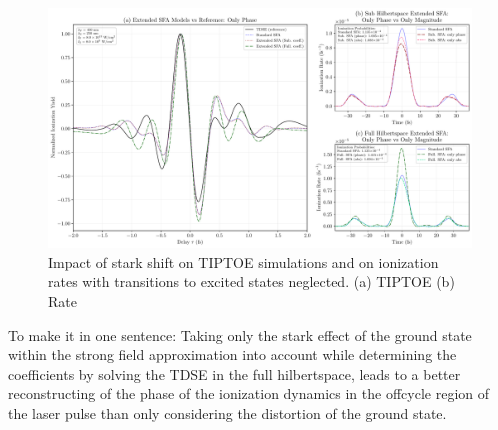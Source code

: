 \begin{figure}
    \centering
    \includegraphics[width=1\textwidth]{../ionModel/python/plotsTIPTOE/3plot_stark-comparison_1_BA.pdf}
    \caption[Impact of stark effect on TIPTOE simulations and ionization rates]{Impact of stark shift on TIPTOE simulations and on ionization rates with transitions to excited states neglected. 
            (a) TIPTOE
            (b) Rate}
    \label{fig:tiptoe_rate_stark}
\end{figure}




\medskip
To make it in one sentence:
Taking only the stark effect of the ground state within the strong field approximation into account while determining the coefficients by solving the TDSE in the full hilbertspace, leads to a better reconstructing of the phase of the ionization dynamics in the offcycle region of the laser pulse than only considering the distortion of the ground state.



